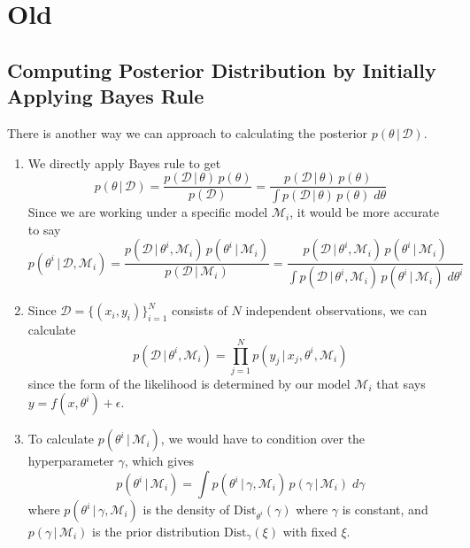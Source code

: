 \section{Old}

\subsection{Computing Posterior Distribution by Initially Applying Bayes Rule}

  There is another way we can approach to calculating the posterior $p(\theta\,|\,\mathcal{D})$.

  \begin{enumerate}
    \item We directly apply Bayes rule to get
    \begin{equation}
      p(\theta\,|\,\mathcal{D}) = \frac{p(\mathcal{D}\,|\,\theta)\, p(\theta)}{p(\mathcal{D})} = \frac{p(\mathcal{D}\,|\,\theta)\, p(\theta)}{\int p(\mathcal{D}\,|\,\theta)\, p(\theta)\; d\theta}
    \end{equation}
    Since we are working under a specific model $\mathcal{M}_i$, it would be more accurate to say
    \begin{equation}
      p(\theta^i \,|\,\mathcal{D}, \mathcal{M}_i) = \frac{p(\mathcal{D}\,|\,\theta^i, \mathcal{M}_i)\, p(\theta^i \,|\,\mathcal{M}_i)}{p(\mathcal{D}\,|\,\mathcal{M}_i)} = \frac{p(\mathcal{D}\,|\,\theta^i, \mathcal{M}_i)\, p(\theta^i \,|\,\mathcal{M}_i)}{\int p(\mathcal{D}\,|\,\theta^i, \mathcal{M}_i)\, p(\theta^i \,|\,\mathcal{M}_i)\; d\theta^i}
    \end{equation}

    \item Since $\mathcal{D} = \{(x_i, y_i)\}_{i=1}^N$ consists of $N$ independent observations, we can calculate
    \begin{equation}
      p(\mathcal{D}\,|\,\theta^i , \mathcal{M}_i) = \prod_{j=1}^N p(y_j \,|\,x_j, \theta^i, \mathcal{M}_i)
    \end{equation}
    since the form of the likelihood is determined by our model $\mathcal{M}_i$ that says $y = f(x, \theta^i) + \epsilon$.

    \item To calculate $p(\theta^i\,|\,\mathcal{M}_i)$, we would have to condition over the hyperparameter $\gamma$, which gives
    \begin{equation}
      p(\theta^i \,|\,\mathcal{M}_i) = \int p(\theta^i\,|\,\gamma, \mathcal{M}_i)\, p(\gamma\,|\,\mathcal{M}_i)\; d\gamma
    \end{equation}
    where $p(\theta^i\,|\,\gamma, \mathcal{M}_i)$ is the density of $\text{Dist}_{\theta^i} (\gamma)$ where $\gamma$ is constant, and $p(\gamma\,|\,\mathcal{M}_i)$ is the prior distribution $\text{Dist}_\gamma (\xi)$ with fixed $\xi$.
  \end{enumerate}

